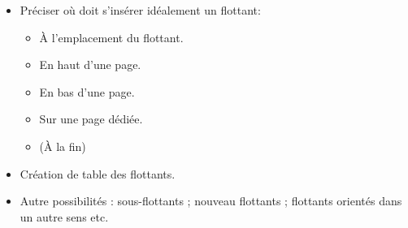 \begin{slide}
  \inputminted{latex}{examples/flottant.tex}
\end{slide}

\begin{slide}
  \begin{itemize}
    \item Préciser où doit s'insérer idéalement un flottant:
      \begin{itemize}
	\item À l'emplacement du flottant.
	\item En haut d'une page.
	\item En bas d'une page.
	\item Sur une page dédiée.
	\item (À la fin)
      \end{itemize}
    \item Création de table des flottants.
    \item Autre possibilités : sous-flottants ; nouveau flottants ; flottants orientés dans un autre sens etc.
  \end{itemize}
\end{slide}
